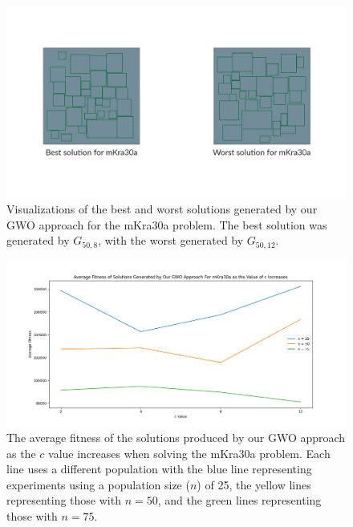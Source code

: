 \begin{figure}[h!]
\centering
\begin{adjustwidth}{-0.45in}{}
	\includegraphics[scale=1.0]{./images/chap07-rd/gwo-mkra30a-best-and-worst-solutions.png}
\end{adjustwidth}
\caption{Visualizations of the best and worst solutions generated by our GWO approach for the mKra30a problem. The best solution was generated by $G_{50,8}$, with the worst generated by $G_{50,12}$.}
\label{approach-gwo-mkra30a-best-and-worst-solutions-visualization}
\end{figure}

\begin{figure}[h!]
\centering
\begin{adjustwidth}{-0.45in}{}
	\includegraphics[scale=0.5]{./images/chap07-rd/gwo-only-mkra30a-average-fitness-as-c-value-increases.png}
\end{adjustwidth}
\caption{The average fitness of the solutions produced by our GWO approach as the $c$ value increases when solving the mKra30a problem. Each line uses a different population with the blue line representing experiments using a population size ($n$) of 25, the yellow lines representing those with $n = 50$, and the green lines representing those with $n = 75$.}
\label{approach-gwo-mkra30a-average-fitness-as-c-value-increases}
\end{figure}


